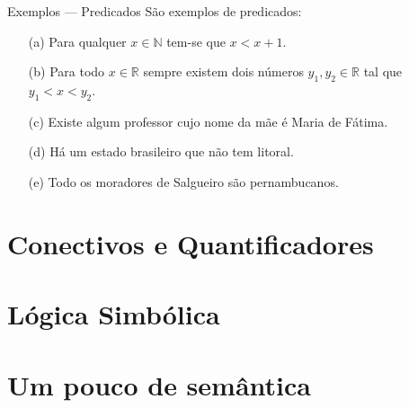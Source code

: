 \documentclass[aspectratio=169]{beamer}
\begin{document}
	\begin{frame}{Exemplos --- Predicados}
		São exemplos de predicados:
		\begin{itemize}
			\item[(a)] Para qualquer $x \in \mathbb{N}$ tem-se que $x < x + 1$.
			\item[(b)] Para todo $x \in \mathbb{R}$ sempre existem dois números $y_1, y_2 \in \mathbb{R}$ tal que $y_1 < x < y_2$.
			\item[(c)] Existe algum professor cujo nome da mãe é Maria de Fátima.
			\item[(d)] Há um estado brasileiro que não tem litoral.
			\item[(e)] Todo os moradores de Salgueiro são pernambucanos.
		\end{itemize}
	\end{frame}

	\section{Conectivos e Quantificadores}
	\section{Lógica Simbólica}
	\section{Um pouco de semântica}
\end{document}
